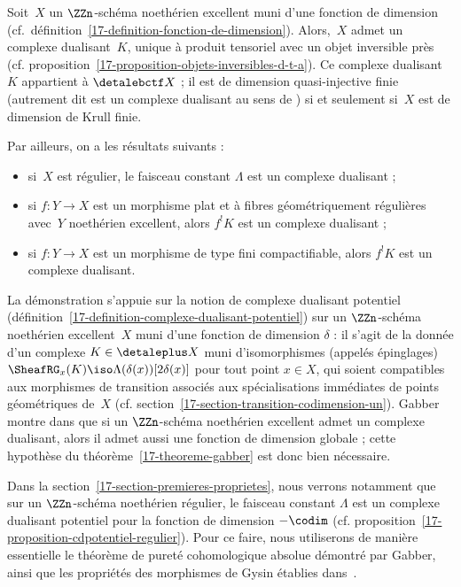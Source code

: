\documentclass[10pt]{../fichiers-configuration-latex/smfart}
\begin{document}
\begin{theoreme}[Gabber]\label{17-theoreme-gabber}
Soit $X$ un $\ZZn$-schéma noethérien excellent muni d'une fonction de
dimension (cf.~définition~\ref{17-definition-fonction-de-dimension}).
Alors, $X$ admet un complexe dualisant $K$, unique à produit
tensoriel avec un objet inversible près (cf.
proposition~\ref{17-proposition-objets-inversibles-d-t-a}).
Ce complexe dualisant $K$ appartient à $\detalebctf X$ ; il est de dimension
quasi-injective finie (autrement dit est un complexe dualisant au sens de
) si et seulement si $X$ est de dimension de Krull finie.

Par ailleurs, on a les résultats suivants :
\begin{itemize}
\item si $X$ est régulier, le faisceau constant $\Lambda$ est un complexe 
dualisant ;
\item si $f\colon Y\to X$ est un morphisme plat et à fibres géométriquement
régulières avec $Y$ noethérien excellent, alors $f^!K$ est un complexe
dualisant ;
\item si $f\colon Y\to X$ est un morphisme de type fini compactifiable,
alors $f^!K$ est un complexe dualisant.
\end{itemize}
\end{theoreme}

La démonstration s'appuie sur la notion de complexe dualisant potentiel
(définition~\ref{17-definition-complexe-dualisant-potentiel}) sur un
$\ZZn$-schéma noethérien excellent $X$ muni d'une fonction de dimension
$\delta$ : il s'agit de la donnée d'un complexe $K\in\detaleplus X$ muni
d'isomorphismes (appelés épinglages) $\SheafRG_x(K)\iso
\Lambda(\delta(x))[2\delta(x)]$ pour tout point $x\in X$, qui soient
compatibles aux morphismes de transition associés aux spécialisations
immédiates de points géométriques de $X$ (cf.
section~\ref{17-section-transition-codimension-un}). Gabber montre 
dans \cite[lemma~8.1]{T@Gabber}
que si un $\ZZn$-schéma noethérien excellent admet un
complexe dualisant, alors il admet aussi une fonction de dimension globale ;
cette hypothèse du théorème~\ref{17-theoreme-gabber}
est donc bien nécessaire.

Dans la section~\ref{17-section-premieres-proprietes}, nous verrons notamment
que sur un $\ZZn$-schéma noethérien régulier, le faisceau constant
$\Lambda$ est un complexe dualisant potentiel pour la fonction de dimension
$-\codim$ (cf. proposition~\ref{17-proposition-cdpotentiel-regulier}).
Pour ce faire, nous utiliserons de manière essentielle le
théorème de pureté cohomologique absolue démontré par Gabber, ainsi que les
propriétés des morphismes de Gysin établies
dans~.
\end{document}
